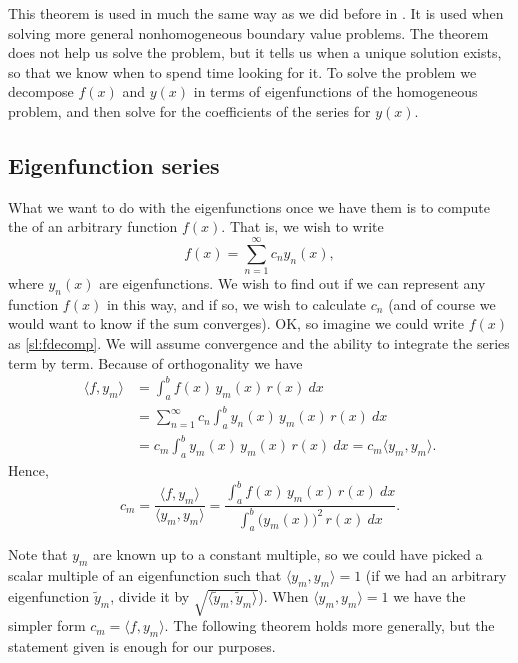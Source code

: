 This theorem is used in much the same way as we did before in
.  It is used when solving more general nonhomogeneous
boundary value problems.  The theorem does not help us solve the problem, but
it tells us when a unique solution exists, so
that we know when to spend time looking for it.  To solve the problem
we decompose $f(x)$ and $y(x)$ in terms of eigenfunctions of the
homogeneous
problem, and then solve for the coefficients of the series for $y(x)$.

\subsection{Eigenfunction series}

What we want to do with the eigenfunctions once we have them is to
compute the \emph{} of an arbitrary
function $f(x)$.  That is, we wish to write
\begin{equation} \label{sl:fdecomp}
f(x) = \sum_{n=1}^\infty c_n y_n(x) ,
\end{equation}
where $y_n(x)$ are eigenfunctions.
We wish to find out if we can represent
any function $f(x)$ in this way,
and if so, we wish to calculate $c_n$ (and of course we would want to know if
the sum converges).  OK\@, so imagine
we could write $f(x)$ as \eqref{sl:fdecomp}.  We will assume convergence and
the ability to integrate the series term by term.
Because of orthogonality we have
\begin{equation*}
\begin{split}
\langle f , y_m \rangle & =
\int_a^b f(x) \, y_m (x) \, r(x) ~ dx\\
&= \sum_{n=1}^\infty c_n \int_a^b y_n(x) \, y_m (x) \, r(x) ~ dx\\
&= c_m \int_a^b y_m(x) \, y_m (x) \, r(x) ~ dx = c_m \langle y_m , y_m \rangle
.
\end{split}
\end{equation*}
Hence,
\begin{equation} \label{sl:cm}
\boxed{~~
c_m = \frac{\langle f , y_m \rangle}{\langle y_m , y_m \rangle}
=
\frac{\int_a^b f(x) \, y_m (x)\, r(x) ~ dx}%
{\int_a^b {\bigl(y_m(x)\bigr)}^2 \, r(x) ~dx} .
~~}
\end{equation}

Note that $y_m$ are known up to a constant multiple, so we could have picked
a scalar multiple of an eigenfunction such that
$\langle y_m , y_m \rangle = 1$ (if we had an arbitrary eigenfunction
$\tilde{y}_m$, divide it
by $\sqrt{\langle \tilde{y}_m , \tilde{y}_m \rangle}$).
When
$\langle y_m , y_m \rangle = 1$
we have the
simpler form $c_m = \langle f, y_m \rangle$.
The following theorem holds
more generally, but the statement given is enough for our purposes.

